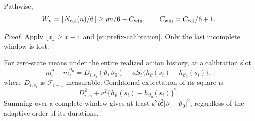 \begin{lemma}
\label{lem:prefix-window-count}
Pathwise,
\begin{equation}
 W_n=\lfloor N_{\rm cal}(n)/6\rfloor
 \ge\rho n/6-C_{\rm win},\qquad C_{\rm win}=C_{\rm cal}/6+1.
 \label{eq:complete-window-count}
\end{equation}
\end{lemma}
\begin{proof}
Apply \(\lfloor x\rfloor\ge x-1\) and \eqref{eq:prefix-calibration}.
Only the last incomplete window is lost.
\end{proof}
For zero-state means under the entire realized action history, at a
calibration slot
\begin{equation}
 m_i^\vartheta-m_i^{\vartheta_0}
 =D_{i,s_i}(\vartheta,\vartheta_0)
 +aS_i\{h_\vartheta(s_i)-h_{\vartheta_0}(s_i)\},
 \label{eq:sign-decomposition}
\end{equation}
where \(D_{i,s_i}\) is \(\mathcal F_{i-1}\)-measurable. Conditional
expectation of its square is
\begin{equation}
 D_{i,s_i}^2+a^2\{h_\vartheta(s_i)-h_{\vartheta_0}(s_i)\}^2.
 \label{eq:sign-square}
\end{equation}
Summing over a complete window gives at least
\(a^2b_\tau^2|\vartheta-\vartheta_0|^2\), regardless of the adaptive
order of its durations.

